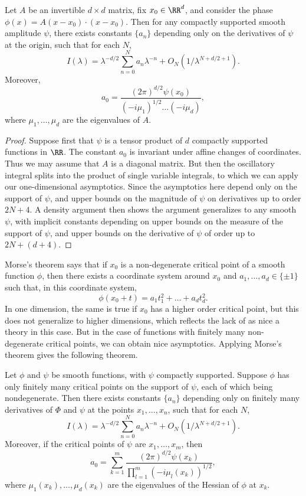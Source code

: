 \begin{theorem}
  Let $A$ be an invertible $d \times d$ matrix, fix $x_0 \in \RR^d$, and consider the phase $\phi(x) = A(x - x_0) \cdot (x - x_0)$. Then for any compactly supported smooth amplitude $\psi$, there exists constants $\{ a_n \}$ depending only on the derivatives of $\psi$ at the origin, such that for each $N$,
  \[ I(\lambda) = \lambda^{-d/2} \sum_{n = 0}^N a_n \lambda^{-n} + O_N(1/\lambda^{N+d/2 +1}). \]
  Moreover,
  \[ a_0 = \frac{(2\pi)^{d/2} \psi(x_0)}{(-i \mu_1)^{1/2} \dots (-i \mu_d)}, \]
  where $\mu_1, \dots, \mu_d$ are the eigenvalues of $A$.
\end{theorem}
\begin{proof}
  Suppose first that $\psi$ is a tensor product of $d$ compactly supported functions in $\RR$. The constant $a_0$ is invariant under affine changes of coordinates. Thus we may assume that $A$ is a diagonal matrix. But then the oscillatory integral splits into the product of single variable integrals, to which we can apply our one-dimensional asymptotics. Since the asymptotics here depend only on the support of $\psi$, and upper bounds on the magnitude of $\psi$ on derivatives up to order $2N + 4$. A density argument then shows the argument generalizes to any smooth $\psi$, with implicit constants depending on upper bounds on the measure of the support of $\psi$, and upper bounds on the derivative of $\psi$ of order up to $2N + (d + 4)$.
\end{proof}

Morse's theorem says that if $x_0$ is a non-degenerate critical point of a smooth function $\phi$, then there exists a coordinate system around $x_0$ and $a_1, \dots, a_d \in \{ \pm 1 \}$ such that, in this coordinate system,
%
\[ \phi(x_0 + t) = a_1 t_1^2 + \dots + a_d t_d^2. \]
%
In one dimension, the same is true if $x_0$ has a higher order critical point, but this does not generalize to higher dimensions, which reflects the lack of as nice a theory in this case. But in the case of functions with finitely many non-degenerate critical points, we can obtain nice asymptotics. Applying Morse's theorem gives the following theorem.

\begin{theorem}
  Let $\phi$ and $\psi$ be smooth functions, with $\psi$ compactly supported. Suppose $\phi$ has only finitely many critical points on the support of $\psi$, each of which being nondegenerate. Then there exists constants $\{ a_n \}$ depending only on finitely many derivatives of $\Phi$ and $\psi$ at the points $x_1, \dots, x_n$, such that for each $N$,
  \[ I(\lambda) = \lambda^{-d/2} \sum_{n = 0}^N a_n \lambda^{-n} + O_N(1/\lambda^{N+d/2 +1}). \]
  Moreover, if the critical points of $\psi$ are $x_1, \dots, x_m$, then
  \[ a_0 = \sum_{k = 1}^m \frac{(2\pi)^{d/2} \psi(x_k)}{\prod_{l = 1}^m (-i \mu_l(x_k))^{1/2}}, \]
  where $\mu_1(x_k), \dots, \mu_d(x_k)$ are the eigenvalues of the Hessian of $\phi$ at $x_k$.
\end{theorem}

